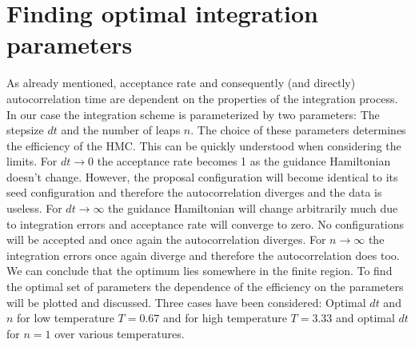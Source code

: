 \documentclass[11pt, a4paper]{scrartcl}
\begin{document}
\section{Finding optimal integration parameters}
    As already mentioned, acceptance rate and consequently (and directly) autocorrelation time are dependent on the properties of the integration process. In our case the integration scheme is parameterized by two parameters: The stepsize $dt$ and the number of leaps $n$. The choice of these parameters determines the efficiency of the HMC. This can be quickly understood when considering the limits. For $dt \rightarrow 0$ the acceptance rate becomes 1 as the guidance Hamiltonian doesn't change. However, the proposal configuration will become identical to its seed configuration and therefore the autocorrelation diverges and the data is useless. For $dt \rightarrow \infty$ the guidance Hamiltonian will change arbitrarily much due to integration errors and acceptance rate will converge to zero. No configurations will be accepted and once again the autocorrelation diverges. For $n \rightarrow \infty$ the integration errors once again diverge and therefore the autocorrelation does too. We can conclude that the optimum lies somewhere in the finite region. To find the optimal set of parameters the dependence of the efficiency on the parameters will be plotted and discussed. Three cases have been considered: Optimal $dt$ and $n$ for low temperature $T=0.67$ and for high temperature $T=3.33$ and optimal $dt$ for $n = 1$ over various temperatures.
\end{document}

